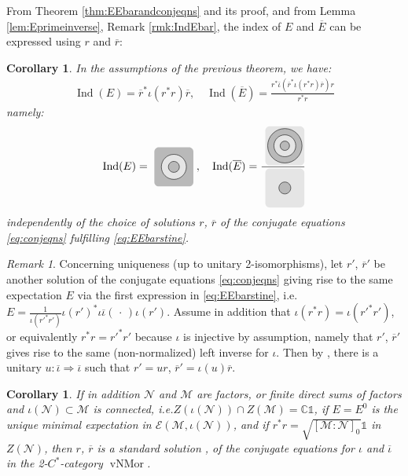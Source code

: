 \documentclass[11pt,a4paper]{article}
\makeatletter
\newcommand{\oneop}{\mathds{1}}
\newcommand{\rbar}{{\overline{r}}}
\newcommand{\iotabar}{{\overline{\iota}}}
\newcommand{\Ebar}{{\overline{E}}}
\newcommand{\slot}{{\,\cdot \,}}
\newcommand{\E}{\mathcal{E}}
\newcommand{\M}{\mathcal{M}}
\newcommand{\N}{\mathcal{N}}
\newcommand{\CC}{\mathbb{C}}
\DeclareMathOperator{\vNMor}{vNMor}
\DeclareMathOperator{\Ind}{Ind}
\DeclareRobustCommand{\ie}{i.e.\@\xspace}
\DeclareRobustCommand{\Lem}{Lem.\@\xspace}
\newcommand{\Cstar}{$C^\ast$\@\xspace}
\theoremstyle{plain}
\newtheorem{cor}[thm]{Corollary}
\theoremstyle{definition}
\theoremstyle{remark}
\newtheorem{rmk}[thm]{Remark}
\numberwithin{equation}{section}%
\newcommand{\colN}{gray!20}
\newcommand{\colM}{gray!55}
\newcommand{\tikzmath}[2][]
     {\vcenter{\hbox{
     \begin{tikzpicture}[#1]#2
     \end{tikzpicture}}}
     }
\makeatother
\begin{document}
From Theorem \ref{thm:EEbarandconjeqns} and its proof, and from Lemma \ref{lem:Eprimeinverse}, Remark \ref{rmk:IndEbar}, the index of $E$ and $\Ebar$ can be expressed using  $r$ and $\rbar$:

\begin{cor}\label{cor:Indexsolconjeqns}
In the assumptions of the previous theorem, we have:
\begin{align} 
\Ind(E) = \rbar^* \iota(r^*r) \rbar, \quad \Ind(\Ebar) = \frac{r^*\iotabar(\rbar^* \iota(r^*r) \rbar)r}{r^*r}
\end{align}
namely:
\begin{align}
\Ind(E) = \tikzmath[scale=.5]{
\fill[\colM,rounded corners] (-1,-1.25) rectangle (1.5,1.25);
\draw[fill = \colN] (.25,0) circle (.8);
\draw[fill = \colM] (.25,0) circle (.35);
}\;,
\quad
\Ind(\Ebar) = \frac{\tikzmath[scale=.5]{
\fill[\colN,rounded corners] (-1,-1.25) rectangle (1.5,1.25);
\draw[fill = \colM] (.25,0) circle (1.1);
\draw[fill = \colN] (.25,0) circle (.7);
\draw[fill = \colM] (.25,0) circle (.3);
}}{\tikzmath[scale=.5]{
\fill[\colN,rounded corners] (-1,-1.25) rectangle (1.5,1.25);
\draw[fill = \colM] (.25,0) circle (.38);
}}
\end{align}
independently of the choice of solutions $r$, $\rbar$ of the conjugate equations \eqref{eq:conjeqns} fulfilling \eqref{eq:EEbarstine}.
\end{cor}

\begin{rmk}\label{rmk:uniquenessunitariesrrbarfromE}
Concerning uniqueness (up to unitary 2-isomorphisms), let $r'$, $\rbar'$ be another solution of the conjugate equations \eqref{eq:conjeqns} giving rise to the same expectation $E$ via the first expression in \eqref{eq:EEbarstine}, \ie $E = \frac{1}{\iota({r'}^*r')} \iota(r')^* \iota\iotabar (\slot) \iota(r')$. 
Assume in addition that $\iota(r^*r) = \iota({r'}^*r')$, or equivalently $r^*r = {r'}^*r'$ because $\iota$ is injective by assumption, namely that $r'$, $\rbar'$ gives rise to the same (non-normalized) left inverse for $\iota$. Then by \cite[\Lem 3.3]{LoRo97}, \cite[\Lem 8.12]{GiLo19} there is a unitary $u:\iotabar \Rightarrow \iotabar$ such that $r' = u r$, $\rbar' = \iota(u) \rbar$.
\end{rmk}

\begin{cor}\label{cor:stdsol}
If in addition $\N$ and $\M$ are factors, or finite direct sums of factors and $\iota(\N)\subset\M$ is connected, \ie $Z(\iota(\N)) \cap Z(\M) = \CC\oneop$, if $E=E^0$ is the unique minimal expectation in $\E(\M,\iota(\N))$, and if $r^*r = \sqrt{[\M:\N]_0} \oneop$ in $Z(\N)$, then $r$, $\rbar$ is a standard solution \cite{LoRo97}, \cite{GiLo19} of the conjugate equations for $\iota$ and $\iotabar$ in the 2-\Cstar-category $\vNMor$.
\end{cor}
\end{document}
